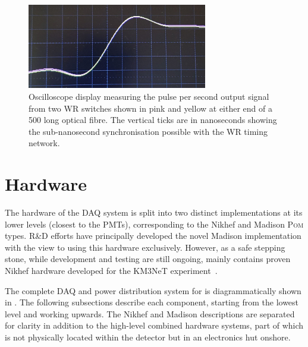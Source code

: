 \begin{figure} %
    \includegraphics[width=0.7\textwidth]{diagrams/5-daq/sync.pdf}
    \caption[Picture of White Rabbit timing synchronisation seen within \chipsfive]
    {Oscilloscope display measuring the pulse per second output signal from two WR switches shown
        in pink and yellow at either end of a \unit{500}{} long optical fibre. The
        vertical ticks are in nanoseconds showing the sub-nanosecond synchronisation possible with
        the WR timing network.}
    \label{fig:sync}
\end{figure}

\section{Hardware} %
\label{sec:daq_hard} %

The hardware of the \chipsfive DAQ system is split into two distinct implementations at its lower
levels (closest to the PMTs), corresponding to the Nikhef and Madison \textsc{Pom} types. \chips
R\&D efforts have principally developed the novel Madison implementation with the view to using
this hardware exclusively. However, as a safe stepping stone, while development and testing are
still ongoing, \chipsfive mainly contains proven Nikhef hardware developed for the KM3NeT
experiment~\cite{adrian2016}.

The complete DAQ and power distribution system for \chipsfive is diagrammatically shown in
. The following subsections describe each component, starting from the lowest
level and working upwards. The Nikhef and Madison descriptions are separated for clarity in
addition to the high-level combined hardware systems, part of which is not physically located
within the detector but in an electronics hut onshore.


